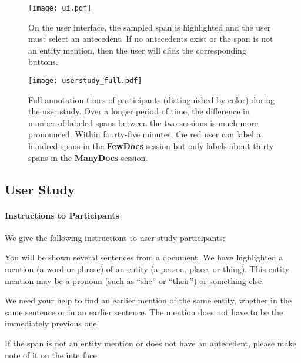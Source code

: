 


\begin{figure*}[!t]
    \centering
    \texttt{[image: ui.pdf]}
    \caption{On the user interface, the sampled span
    is highlighted and the user must select an antecedent. If
    no antecedents exist or the span is not an entity mention, then the user
    will click the corresponding buttons.
    }
    \label{fig:ui}
\end{figure*}


\begin{figure}[!t]
    \centering
    \texttt{[image: userstudy\_full.pdf]}
    \caption{Full annotation times of participants (distinguished by color) during the user study. Over a
    longer period of time, the difference in number of labeled spans between the
    two sessions is much more pronounced. Within fourty-five minutes, the
    {\color{red}red} user can label a
    hundred spans in the \textbf{FewDocs} session but only labels about thirty spans
    in the \textbf{ManyDocs} session.}
    \label{fig:full}
\end{figure}

\subsection{User Study}
\label{ssec:user_appendix}

\paragraph{Instructions to Participants} We give the following instructions
to user study participants:
\begin{displayquote}
\normalsize
You will be shown several sentences from a
document. We have highlighted a mention (a word or phrase) of an entity (a
person, place, or thing). This entity mention may be a pronoun (such as ``she''
or ``their'') or something else. 

We need your help to find an earlier mention of
the same entity, whether in the same sentence or in an earlier sentence. The
mention does not have to be the immediately previous one. 

If the span is not an
entity mention or does not have an antecedent, please make note of it on the
interface.
\end{displayquote}

